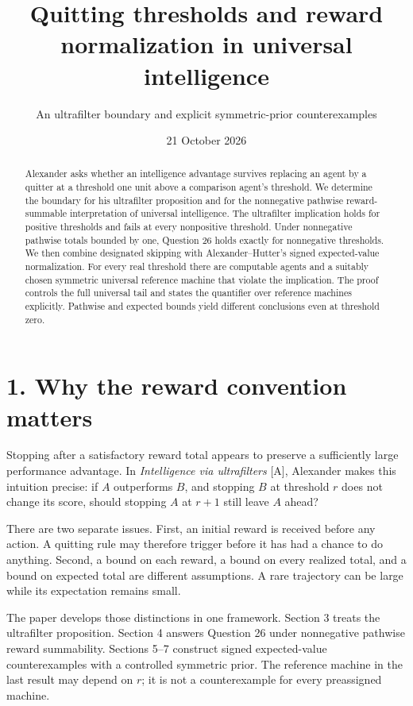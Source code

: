 \documentclass[
  11pt,
  letterpaper,
]{article}
\title{Quitting thresholds and reward normalization in universal
intelligence}
\subtitle{An ultrafilter boundary and explicit symmetric-prior
counterexamples}
\author{}
\date{21 October 2026}
\begin{document}
\maketitle
\begin{abstract}
Alexander asks whether an intelligence advantage survives replacing an
agent by a quitter at a threshold one unit above a comparison agent's
threshold. We determine the boundary for his ultrafilter proposition and
for the nonnegative pathwise reward-summable interpretation of universal
intelligence. The ultrafilter implication holds for positive thresholds
and fails at every nonpositive threshold. Under nonnegative pathwise
totals bounded by one, Question 26 holds exactly for nonnegative
thresholds. We then combine designated skipping with Alexander--Hutter's
signed expected-value normalization. For every real threshold there are
computable agents and a suitably chosen symmetric universal reference
machine that violate the implication. The proof controls the full
universal tail and states the quantifier over reference machines
explicitly. Pathwise and expected bounds yield different conclusions
even at threshold zero.
\end{abstract}

\section{1. Why the reward convention
matters}\label{why-the-reward-convention-matters}

Stopping after a satisfactory reward total appears to preserve a
sufficiently large performance advantage. In \emph{Intelligence via
ultrafilters} {[}A{]}, Alexander makes this intuition precise: if \(A\)
outperforms \(B\), and stopping \(B\) at threshold \(r\) does not change
its score, should stopping \(A\) at \(r+1\) still leave \(A\) ahead?

There are two separate issues. First, an initial reward is received
before any action. A quitting rule may therefore trigger before it has
had a chance to do anything. Second, a bound on each reward, a bound on
every realized total, and a bound on expected total are different
assumptions. A rare trajectory can be large while its expectation
remains small.

The paper develops those distinctions in one framework. Section 3 treats
the ultrafilter proposition. Section 4 answers Question 26 under
nonnegative pathwise reward summability. Sections 5--7 construct signed
expected-value counterexamples with a controlled symmetric prior. The
reference machine in the last result may depend on \(r\); it is not a
counterexample for every preassigned machine.
\end{document}
